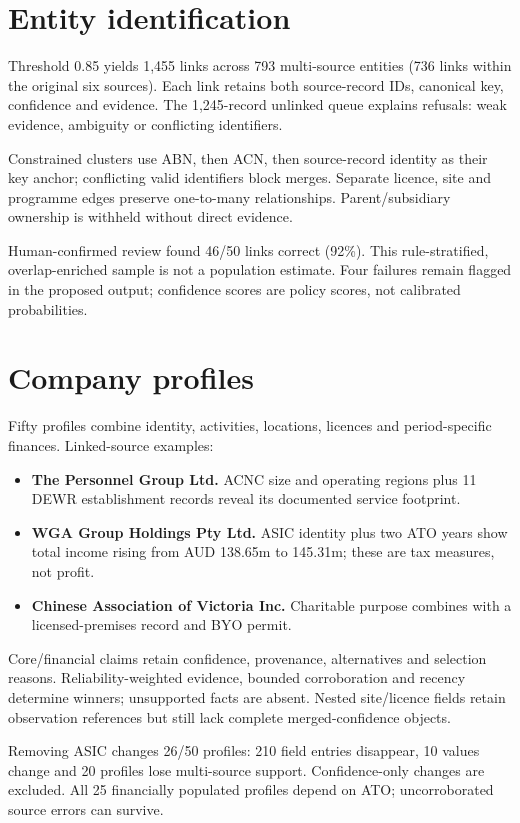 \documentclass[10pt,a4paper]{article}
\begin{document}
\section{Entity identification}
Threshold 0.85 yields 1,455 links across 793 multi-source entities (736 links within the original six sources). Each link retains both source-record IDs, canonical key, confidence and evidence. The 1,245-record unlinked queue explains refusals: weak evidence, ambiguity or conflicting identifiers.\par
Constrained clusters use ABN, then ACN, then source-record identity as their key anchor; conflicting valid identifiers block merges. Separate licence, site and programme edges preserve one-to-many relationships. Parent/subsidiary ownership is withheld without direct evidence.\par
Human-confirmed review found 46/50 links correct (92\%). This rule-stratified, overlap-enriched sample is not a population estimate. Four failures remain flagged in the proposed output; confidence scores are policy scores, not calibrated probabilities.\par
\section{Company profiles}
Fifty profiles combine identity, activities, locations, licences and period-specific finances. Linked-source examples:\par
\begin{itemize}
\item \textbf{The Personnel Group Ltd.} ACNC size and operating regions plus 11 DEWR establishment records reveal its documented service footprint.
\item \textbf{WGA Group Holdings Pty Ltd.} ASIC identity plus two ATO years show total income rising from AUD 138.65m to 145.31m; these are tax measures, not profit.
\item \textbf{Chinese Association of Victoria Inc.} Charitable purpose combines with a licensed-premises record and BYO permit.
\end{itemize}
Core/financial claims retain confidence, provenance, alternatives and selection reasons. Reliability-weighted evidence, bounded corroboration and recency determine winners; unsupported facts are absent. Nested site/licence fields retain observation references but still lack complete merged-confidence objects.\par
Removing ASIC changes 26/50 profiles: 210 field entries disappear, 10 values change and 20 profiles lose multi-source support. Confidence-only changes are excluded. All 25 financially populated profiles depend on ATO; uncorroborated source errors can survive.\par
\newpage
\end{document}

